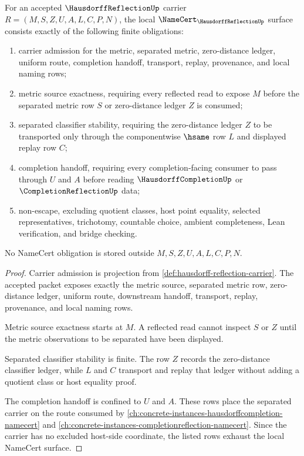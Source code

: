 \begin{theorem}
\label{thm:hausdorff-reflection-namecert-obligations}
For an accepted $\HausdorffReflectionUp$ carrier $R=(M,S,Z,U,A,L,C,P,N)$, the local $\NameCert_{\HausdorffReflectionUp}$ surface consists exactly of the following finite obligations:
\begin{enumerate}
\item carrier admission for the metric, separated metric, zero-distance ledger, uniform route, completion handoff, transport, replay, provenance, and local naming rows;
\item metric source exactness, requiring every reflected read to expose $M$ before the separated metric row $S$ or zero-distance ledger $Z$ is consumed;
\item separated classifier stability, requiring the zero-distance ledger $Z$ to be transported only through the componentwise $\hsame$ row $L$ and displayed replay row $C$;
\item completion handoff, requiring every completion-facing consumer to pass through $U$ and $A$ before reading $\HausdorffCompletionUp$ or $\CompletionReflectionUp$ data;
\item non-escape, excluding quotient classes, host point equality, selected representatives, trichotomy, countable choice, ambient completeness, Lean verification, and bridge checking.
\end{enumerate}
No NameCert obligation is stored outside $M,S,Z,U,A,L,C,P,N$.
\end{theorem}
\begin{proof}
Carrier admission is projection from \autoref{def:hausdorff-reflection-carrier}. The accepted packet exposes exactly the metric source, separated metric row, zero-distance ledger, uniform route, downstream handoff, transport, replay, provenance, and local naming rows.

Metric source exactness starts at $M$. A reflected read cannot inspect $S$ or $Z$ until the metric observations to be separated have been displayed.

Separated classifier stability is finite. The row $Z$ records the zero-distance classifier ledger, while $L$ and $C$ transport and replay that ledger without adding a quotient class or host equality proof.

The completion handoff is confined to $U$ and $A$. These rows place the separated carrier on the route consumed by \autoref{ch:concrete-instances-hausdorffcompletion-namecert} and \autoref{ch:concrete-instances-completionreflection-namecert}. Since the carrier has no excluded host-side coordinate, the listed rows exhaust the local NameCert surface.
\end{proof}

